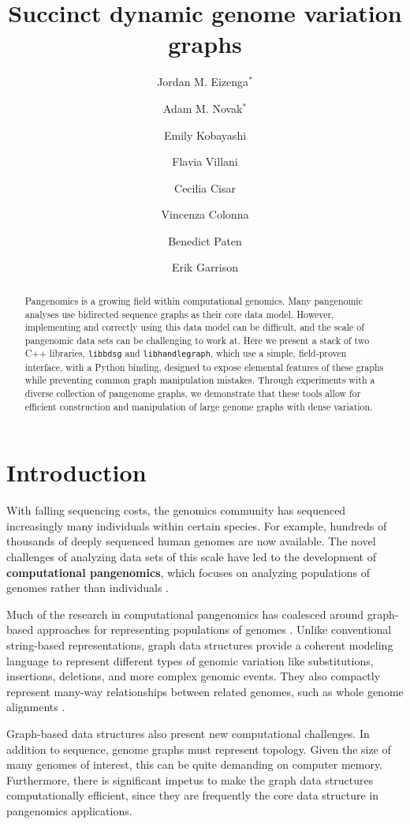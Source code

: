 \documentclass{article}
\title{Succinct dynamic genome variation graphs} %
\author{Jordan M. Eizenga$^*$ \and Adam M. Novak$^*$ \and Emily Kobayashi \and Flavia Villani  \and Cecilia Cisar \and Vincenza Colonna \and Benedict Paten \and Erik Garrison}
\newcommand{\vocab}{\textbf}
\begin{document}
\maketitle

\begin{abstract}

Pangenomics is a growing field within computational genomics.
Many pangenomic analyses use bidirected sequence graphs as their core data model.
However, implementing and correctly using this data model can be difficult, and the scale of pangenomic data sets can be challenging to work at.
Here we present a stack of two C++ libraries, \texttt{libbdsg} and \texttt{libhandlegraph}, which use a simple, field-proven interface, with a Python binding, designed to expose elemental features of these graphs while preventing common graph manipulation mistakes.
Through experiments with a diverse collection of pangenome graphs, we demonstrate that these tools allow for efficient construction and manipulation of large genome graphs with dense variation.

\end{abstract}

\section{Introduction}


With falling sequencing costs, the genomics community has sequenced increasingly many individuals within certain species.
For example, hundreds of thousands of deeply sequenced human genomes are now available.
The novel challenges of analyzing data sets of this scale have led to the development of \vocab{computational pangenomics}, which focuses on analyzing populations of genomes rather than individuals \cite{computational2016computational}.

Much of the research in computational pangenomics has coalesced around graph-based approaches for representing populations of genomes \cite{Paten_2017}.
Unlike conventional string-based representations, graph data structures provide a coherent modeling language to represent different types of genomic variation like substitutions, insertions, deletions, and more complex genomic events.
They also compactly represent many-way relationships between related genomes, such as whole genome alignments \cite{kehr2014genome}.

Graph-based data structures also present new computational challenges.
In addition to sequence, genome graphs must represent topology.
Given the size of many genomes of interest, this can be quite demanding on computer memory.
Furthermore, there is significant impetus to make the graph data structures computationally efficient, since they are frequently the core data structure in pangenomics applications.
\end{document}
